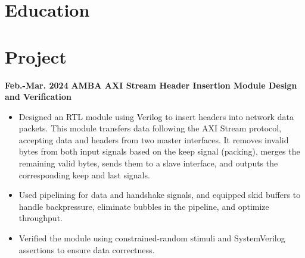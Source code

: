 \documentclass[11pt,a4paper,sans]{moderncv}
\begin{document}
\makecvtitle
\vspace{-1.5cm} 

\section{Education}

\vspace{-0.5cm} 
\section{Project}

\cventry
{\textnormal{\textbf{Feb.-Mar. 2024}}}
{\textnormal{\textbf{AMBA AXI Stream Header Insertion Module Design and Verification}}}
{}{}{}
{
    \begin{itemize}
        \item Designed an RTL module using Verilog to insert headers into network data packets. This module transfers data following the AXI Stream protocol, accepting data and headers from two master interfaces. It removes invalid bytes from both input signals based on the keep signal (packing), merges the remaining valid bytes, sends them to a slave interface, and outputs the corresponding keep and last signals.
        \item Used pipelining for data and handshake signals, and equipped skid buffers to handle backpressure, eliminate bubbles in the pipeline, and optimize throughput.
        \item Verified the module using constrained-random stimuli and SystemVerilog assertions to ensure data correctness.
    \end{itemize}
}
\end{document}
